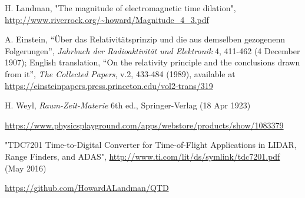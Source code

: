 \documentclass[12pt]{amsart}
\theoremstyle{plain}
\theoremstyle{definition}
\theoremstyle{remark}
\begin{document}
\begin{thebibliography}{10}
H. Landman,
"The magnitude of electromagnetic time dilation",
\url{http://www.riverrock.org/~howard/Magnitude_4_3.pdf}

A. Einstein, ``\"{U}ber das Relativit\"{a}tsprinzip und die aus demselben gezogenenn Folgerungen'',
{\em Jahrbuch der Radioaktivit\"{a}t und Elektronik} 4, 411-462 (4 December 1907);
English translation, ``On the relativity principle and the conclusions drawn from it'',
{\em The Collected Papers}, v.2, 433-484 (1989),
available at \url{https://einsteinpapers.press.princeton.edu/vol2-trans/319}

H. Weyl,
{\em Raum-Zeit-Materie} 6th ed.,
Springer-Verlag (18 Apr 1923)


\url{https://www.physicsplayground.com/apps/webstore/products/show/1083379}

"TDC7201 Time-to-Digital Converter for Time-of-Flight Applications in LIDAR, Range Finders, and ADAS",
\url{http://www.ti.com/lit/ds/symlink/tdc7201.pdf} (May 2016)

\url{https://github.com/HowardALandman/QTD}

\end{thebibliography}
\end{document}
